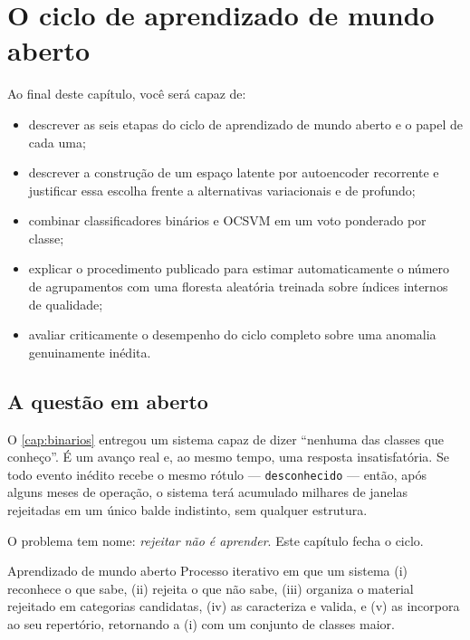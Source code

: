 \chapter{O ciclo de aprendizado de mundo aberto}
\label{cap:mundoaberto}

\begin{objetivos}
Ao final deste capítulo, você será capaz de:
\begin{itemize}[leftmargin=*,itemsep=0.2em]
  \item descrever as seis etapas do ciclo de aprendizado de mundo aberto e o papel de
        cada uma;
  \item descrever a construção de um espaço latente por autoencoder recorrente e
        justificar essa escolha frente a alternativas variacionais e de
         profundo;
  \item combinar classificadores binários e OCSVM em um voto ponderado por classe;
  \item explicar o procedimento publicado para estimar automaticamente o número de
        agrupamentos com uma floresta aleatória treinada sobre índices internos de
        qualidade;
  \item avaliar criticamente o desempenho do ciclo completo sobre uma anomalia
        genuinamente inédita.
\end{itemize}
\end{objetivos}

\section{A questão em aberto}

O \cref{cap:binarios} entregou um sistema capaz de dizer ``nenhuma das classes que
conheço''. É um avanço real e, ao mesmo tempo, uma resposta insatisfatória. Se todo
evento inédito recebe o mesmo rótulo --- \texttt{desconhecido} --- então, após alguns
meses de operação, o sistema terá acumulado milhares de janelas rejeitadas em um único
balde indistinto, sem qualquer estrutura.

O problema tem nome: \emph{rejeitar não é aprender}. Este capítulo fecha o ciclo.

\begin{definicao}{Aprendizado de mundo aberto}
Processo iterativo em que um sistema (i) reconhece o que sabe, (ii) rejeita o que não
sabe, (iii) organiza o material rejeitado em categorias candidatas, (iv) as caracteriza
e valida, e (v) as incorpora ao seu repertório, retornando a (i) com um conjunto de
classes maior.
\end{definicao}

